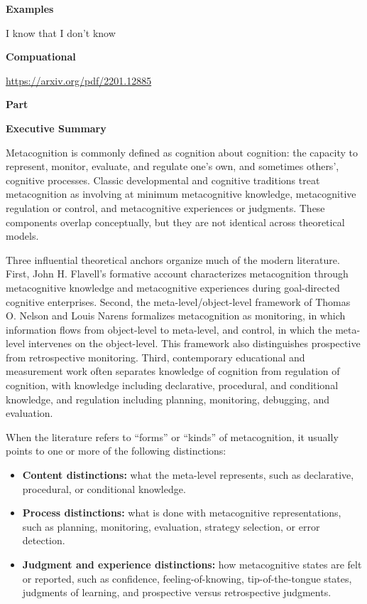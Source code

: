 \documentclass{book}
\providecommand{\ProjectDeepHeading}[2]{%
    \par\medskip\noindent\textbf{#2}\par\smallskip
}
\begin{document}
    \ProjectDeepHeading{7}{Examples}
        I know that I don't know

\ProjectDeepHeading{2}{Compuational}


\url{https://arxiv.org/pdf/2201.12885}

\ProjectDeepHeading{2}{Part}


\ProjectDeepHeading{5}{Executive Summary}

   Metacognition is commonly defined as cognition about cognition: the capacity to represent, monitor, evaluate, and regulate one's own, and sometimes others', cognitive processes. Classic developmental and cognitive traditions treat metacognition as involving at minimum metacognitive knowledge, metacognitive regulation or control, and metacognitive experiences or judgments. These components overlap conceptually, but they are not identical across theoretical models.

   Three influential theoretical anchors organize much of the modern literature. First, John H. Flavell's formative account characterizes metacognition through metacognitive knowledge and metacognitive experiences during goal-directed cognitive enterprises. Second, the meta-level/object-level framework of Thomas O. Nelson and Louis Narens formalizes metacognition as monitoring, in which information flows from object-level to meta-level, and control, in which the meta-level intervenes on the object-level. This framework also distinguishes prospective from retrospective monitoring. Third, contemporary educational and measurement work often separates knowledge of cognition from regulation of cognition, with knowledge including declarative, procedural, and conditional knowledge, and regulation including planning, monitoring, debugging, and evaluation.

   When the literature refers to ``forms'' or ``kinds'' of metacognition, it usually points to one or more of the following distinctions:

   \begin{itemize}
      \item \textbf{Content distinctions:} what the meta-level represents, such as declarative, procedural, or conditional knowledge.
      \item \textbf{Process distinctions:} what is done with metacognitive representations, such as planning, monitoring, evaluation, strategy selection, or error detection.
      \item \textbf{Judgment and experience distinctions:} how metacognitive states are felt or reported, such as confidence, feeling-of-knowing, tip-of-the-tongue states, judgments of learning, and prospective versus retrospective judgments.
   \end{itemize}
\end{document}
